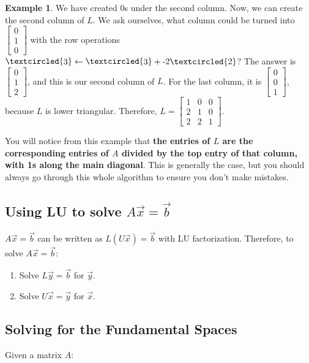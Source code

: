 \documentclass[a4paper,12pt]{article}
\theoremstyle{definition}
\theoremstyle{definition}
\newtheorem{example}{Example}[subsection]
\newcommand{\circlemath}[1]{\raisebox{0.5pt}{\textcircled{\raisebox{-.9pt} #1}}}
\newcommand{\replace}[3]{\circlemath{#1} \leftarrow \circlemath{#1} + \text{#3}\textcircled{#2}}
\newcommand{\mateq}[3]{#1#2 = #3}
\newcommand{\mateqaxb}{\mateq{A}{\vec{x}}{\vec{b}}}
\begin{document}
\begin{example}
		We have created 0s under the second column. Now, we can create the second column of $L$. We ask ourselves, what column could be turned into $\begin{bmatrix}
			0\\
			1\\
			0
		\end{bmatrix}$
		with the row operations
		$\replace{3}{2}{-2}$? The answer is $\begin{bmatrix}
			0\\
			1\\
			2
		\end{bmatrix}$, and this is our second column of $L$. For the last column, it is
		$\begin{bmatrix}
			0\\
			0\\
			1
		\end{bmatrix}$, because $L$ is lower triangular. Therefore, $L = \begin{bmatrix}
		1 & 0 & 0\\
		2 & 1 & 0\\
		2 & 2 & 1
		\end{bmatrix}$.
		
		You will notice from this example that \textbf{the entries of $L$ are the corresponding entries of $A$ divided by the top entry of that column, with 1s along the main diagonal}. This is generally the case, but you should always go through this whole algorithm to ensure you don't make mistakes.
	\end{example}
	
	\subsection{Using LU to solve $\mateqaxb$}
	\label{sec:axb-solve-lu-factor}
	$\mateqaxb$ can be written as $\mateq{L}{(U\vec{x})}{\vec{b}}$ with LU factorization. Therefore, to solve $\mateqaxb$:
	\begin{enumerate}		
		\item Solve $\mateq{L}{\vec{y}}{\vec{b}}$ for $\vec{y}$.
		
		\item Solve $\mateq{U}{\vec{x}}{\vec{y}}$ for $\vec{x}$.
	\end{enumerate}
	
	\subsection{Solving for the Fundamental Spaces}
	\label{sec:solve-fund-spcs}
	Given a matrix $A$:
	
\end{document}
